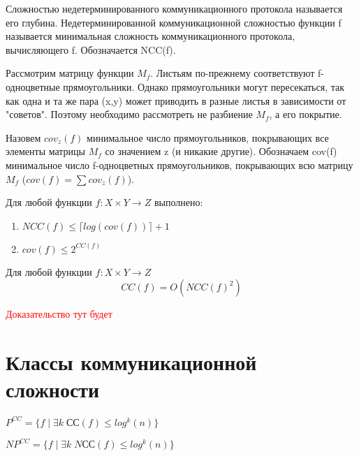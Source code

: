 \documentclass[12pt]{article}
\begin{document}
\begin{Def}
Сложностью недетерминированного коммуникационного протокола называется его глубина.
Недетерминированной коммуникационной сложностью функции f называется минимальная сложность коммуникационного протокола, вычисляющего f. Обозначается NCC(f).
\end{Def}

Рассмотрим матрицу функции $M_f$. Листьям по-прежнему соответствуют f-одноцветные прямоугольники.
Однако прямоугольники могут пересекаться, так как одна и та же пара (x,y) может приводить в разные листья в зависимости от "советов".
Поэтому необходимо рассмотреть не разбиение $M_f$, а его покрытие.

\begin{Def}
Назовем $cov_z(f)$ минимальное число прямоугольников,
покрывающих все элементы матрицы $M_f$ со значением z
(и никакие другие). Обозначаем cov(f) минимальное число f-одноцветных прямоугольников, покрывающих всю
матрицу $M_f$ ($cov(f) = \sum cov_z(f)$).
\end{Def}

\begin{Statement}
Для любой функции $f \colon X \times Y \rightarrow Z$ выполнено:
\begin{enumerate}
    \item
    $NCC(f) \leq \lceil log(cov(f)) \rceil + 1$
    \item
    $cov(f) \leq 2^{CC(f)}$
\end{enumerate}
\end{Statement}

\begin{Th}
    Для любой функции $f \colon X \times Y \rightarrow Z$
    $$CC(f) = O(NCC(f)^2)$$
\end{Th}
\textcolor{red}{Доказательство тут будет}

\section{Классы коммуникационной сложности}
\begin{Def}
    $P^{CC} = \{f \; | \; \exists k \; СС(f) \leq log^k(n)\}$
\end{Def}

\begin{Def}
    $NP^{CC} = \{f \; | \; \exists k \; NСС(f) \leq log^k(n)\}$
\end{Def}
\end{document}
